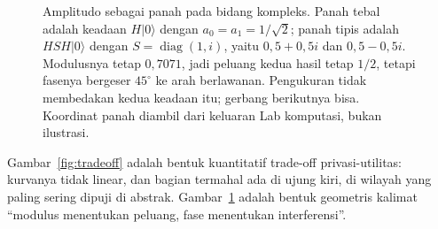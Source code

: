 \begin{figure}
\centering
{}
\caption{Amplitudo sebagai panah pada bidang kompleks. Panah tebal adalah keadaan
$H|0\rangle$ dengan $a_0=a_1=1/\sqrt2$; panah tipis adalah $HSH|0\rangle$ dengan
$S=\operatorname{diag}(1,i)$, yaitu $0{,}5+0{,}5i$ dan $0{,}5-0{,}5i$. Modulusnya tetap
$0{,}7071$, jadi peluang kedua hasil tetap $1/2$, tetapi fasenya bergeser
$45^\circ$ ke arah berlawanan. Pengukuran tidak membedakan kedua keadaan itu; gerbang
berikutnya bisa. Koordinat panah diambil dari keluaran Lab komputasi, bukan ilustrasi.}
\label{fig:fase}
\end{figure}

Gambar~\ref{fig:tradeoff} adalah bentuk kuantitatif trade-off privasi-utilitas: kurvanya
tidak linear, dan bagian termahal ada di ujung kiri, di wilayah yang paling sering dipuji
di abstrak. Gambar~\ref{fig:fase} adalah bentuk geometris kalimat ``modulus menentukan
peluang, fase menentukan interferensi''.

